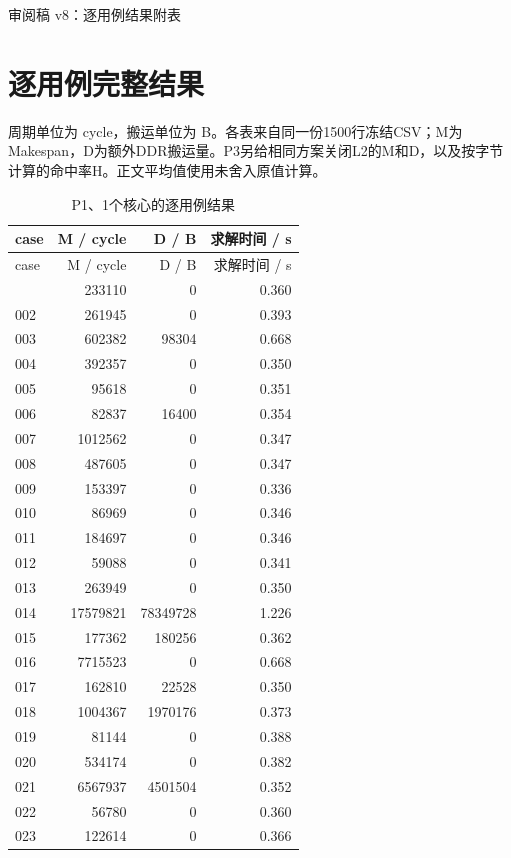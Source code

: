 \documentclass[anonymous,notoc]{gmcm2026}
\begin{document}
\pagestyle{plain}\begin{center}\large 审阅稿 v8：逐用例结果附表\end{center}
\section{逐用例完整结果}
周期单位为 cycle，搬运单位为 B。各表来自同一份1500行冻结CSV；M为Makespan，D为额外DDR搬运量。P3另给相同方案关闭L2的M和D，以及按字节计算的命中率H。正文平均值使用未舍入原值计算。

\begin{longtable}{lrrr}
\caption{P1、1个核心的逐用例结果}\\
\toprule
case & M / cycle & D / B & 求解时间 / s\\\midrule
\endfirsthead
\toprule
case & M / cycle & D / B & 求解时间 / s\\\midrule
\endhead
\bottomrule\endfoot
001 & 233110 & 0 & 0.360 \\
002 & 261945 & 0 & 0.393 \\
003 & 602382 & 98304 & 0.668 \\
004 & 392357 & 0 & 0.350 \\
005 & 95618 & 0 & 0.351 \\
006 & 82837 & 16400 & 0.354 \\
007 & 1012562 & 0 & 0.347 \\
008 & 487605 & 0 & 0.347 \\
009 & 153397 & 0 & 0.336 \\
010 & 86969 & 0 & 0.346 \\
011 & 184697 & 0 & 0.346 \\
012 & 59088 & 0 & 0.341 \\
013 & 263949 & 0 & 0.350 \\
014 & 17579821 & 78349728 & 1.226 \\
015 & 177362 & 180256 & 0.362 \\
016 & 7715523 & 0 & 0.668 \\
017 & 162810 & 22528 & 0.350 \\
018 & 1004367 & 1970176 & 0.373 \\
019 & 81144 & 0 & 0.388 \\
020 & 534174 & 0 & 0.382 \\
021 & 6567937 & 4501504 & 0.352 \\
022 & 56780 & 0 & 0.360 \\
023 & 122614 & 0 & 0.366 \\

\end{longtable}
\end{document}
